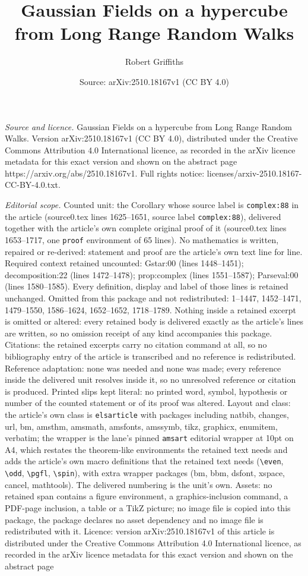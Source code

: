 \documentclass[10pt,a4paper]{amsart}
\title[Gaussian Fields on a hypercube from Long Range Random Walks]{Gaussian Fields on a hypercube from Long Range Random Walks}
\author{Robert Griffiths}
\date{Source: arXiv:2510.18167v1 (CC BY 4.0)}
\begin{document}
\maketitle

\noindent\emph{Source and licence.} Gaussian Fields on a hypercube from Long Range Random Walks. Version arXiv:2510.18167v1 (CC BY 4.0), distributed under the Creative Commons Attribution 4.0 International licence, as recorded in the arXiv licence metadata for this exact version and shown on the abstract page https://arxiv.org/abs/2510.18167v1. Full rights notice: licenses/arxiv-2510.18167-CC-BY-4.0.txt.\par\smallskip

\noindent\textit{Editorial scope.} Counted unit: the Corollary whose source label is \texttt{complex:88} in the article (source0.tex lines 1625--1651, source label \texttt{complex:88}), delivered together with the article's own complete original proof of it (source0.tex lines 1653--1717, one \texttt{proof} environment of 65 lines). No mathematics is written, repaired or re-derived: statement and proof are the article's own text line for line. Required context retained uncounted: Gstar:00 (lines 1448--1451); decomposition:22 (lines 1472--1478); prop:complex (lines 1551--1587); Parseval:00 (lines 1580--1585). Every definition, display and label of those lines is retained unchanged. Omitted from this package and not redistributed: 1--1447, 1452--1471, 1479--1550, 1586--1624, 1652--1652, 1718--1789. Nothing inside a retained excerpt is omitted or altered: every retained body is delivered exactly as the article's lines are written, so no omission receipt of any kind accompanies this package. Citations: the retained excerpts carry no citation command at all, so no bibliography entry of the article is transcribed and no reference is redistributed. Reference adaptation: none was needed and none was made; every reference inside the delivered unit resolves inside it, so no unresolved reference or citation is produced. Printed slips kept literal: no printed word, symbol, hypothesis or number of the counted statement or of its proof was altered. Layout and class: the article's own class is \texttt{elsarticle} with packages including natbib, changes, url, bm, amsthm, amsmath, amsfonts, amssymb, tikz, graphicx, enumitem, verbatim; the wrapper is the lane's pinned \texttt{amsart} editorial wrapper at 10pt on A4, which restates the theorem-like environments the retained text needs and adds the article's own macro definitions that the retained text needs (\texttt{\textbackslash even}, \texttt{\textbackslash odd}, \texttt{\textbackslash pgfl}, \texttt{\textbackslash spin}), with extra wrapper packages (bm, bbm, dsfont, xspace, cancel, mathtools). The delivered numbering is the unit's own. Assets: no retained span contains a figure environment, a graphics-inclusion command, a PDF-page inclusion, a table or a TikZ picture; no image file is copied into this package, the package declares no asset dependency and no image file is redistributed with it. Licence: version arXiv:2510.18167v1 of this article is distributed under the Creative Commons Attribution 4.0 International licence, as recorded in the arXiv licence metadata for this exact version and shown on the abstract page 
\end{document}
